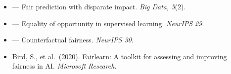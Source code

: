 \begin{itemize}
    \item \textcite{chouldechova2017fair} --- Fair prediction with disparate impact. \textit{Big Data, 5}(2).
    \item \textcite{hardt2016equality} --- Equality of opportunity in supervised learning. \textit{NeurIPS 29}.
    \item \textcite{kusner2017counterfactual} --- Counterfactual fairness. \textit{NeurIPS 30}.
    \item Bird, S., et al.\ (2020). Fairlearn: A toolkit for assessing and improving fairness in AI. \textit{Microsoft Research}.
\end{itemize}
\apxnumoff
